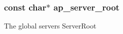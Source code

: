 \subsubsection[{\texorpdfstring{ap\+\_\+server\+\_\+root}{ap_server_root}}]{ const char$\ast$ ap\+\_\+server\+\_\+root}\hypertarget{group__APACHE__CORE__MAIN_ga1c757ac6b804d090fba90a28bdbb0d8a}{}\label{group__APACHE__CORE__MAIN_ga1c757ac6b804d090fba90a28bdbb0d8a}
The global server\textquotesingle{}s Server\+Root 